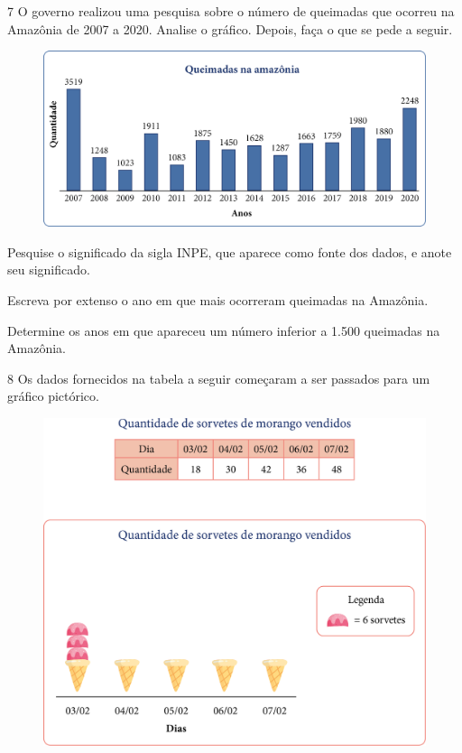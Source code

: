 \num{7} O governo realizou uma pesquisa sobre o número de queimadas que
ocorreu na Amazônia de 2007 a 2020. Analise o gráfico. Depois, faça o que se pede a seguir.


\begin{figure}[htpb!]
\centering
\includegraphics[width=.7\textwidth]{media/image46.png}
\end{figure}


\begin{escolha}
\item
  Pesquise o significado da sigla INPE, que aparece como fonte dos dados,
  e anote seu significado.\\

\item
  Escreva por extenso o ano em que mais ocorreram queimadas na Amazônia.\\

\item
  Determine os anos em que apareceu um número inferior a 1.500 queimadas na
  Amazônia.\\
\end{escolha}

\num{8} Os dados fornecidos na tabela a seguir começaram a ser passados para um
gráfico pictórico.

\begin{figure}[htpb!]
\centering
\includegraphics[width=\textwidth]{media/image47.png}
\end{figure}

